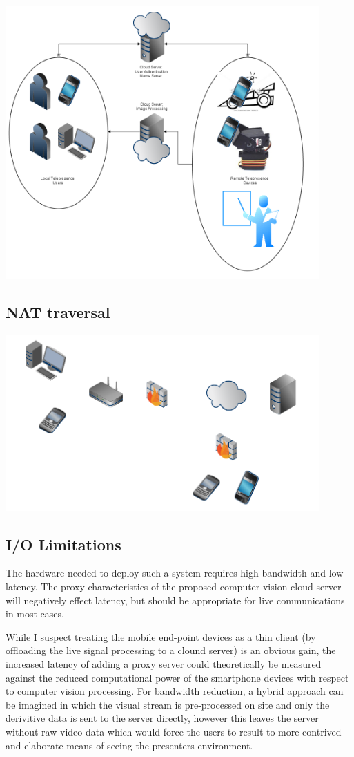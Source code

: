 \documentclass[a4paper,12pt]{report}
\begin{document}
\includegraphics[width=12cm]{overview}
	\subsection{NAT traversal}
		\includegraphics[width=12cm]{networkModel}
	\subsection{I/O Limitations}

The hardware needed to deploy such a system requires high bandwidth and low latency. The proxy characteristics of the proposed computer vision cloud server will negatively effect latency, but should be appropriate for live communications in most cases.

While I suspect treating the mobile end-point devices as a thin client (by offloading the live signal processing to a clound server) is an obvious gain, the increased latency of adding a proxy server could theoretically be measured against the reduced computational power of the smartphone devices with respect to computer vision processing. For bandwidth reduction, a hybrid approach can be imagined in which the visual stream is pre-processed on site and only the derivitive data is sent to the server directly, however this leaves the server without raw video data which would force the users to result to more contrived and elaborate means of seeing the presenters environment.
\end{document}
